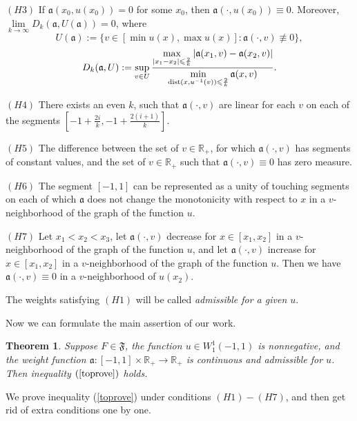 \documentclass[12pt]{article}
\newcommand{\Real}{\mathbb R}
\newcommand{\abs}[1]{\left\vert#1\right\vert}
\renewcommand{\le}{\leqslant}
\newtheorem{thm}{Theorem}
\newcommand{\W}{W_1^1}
\newcommand{\dist}{\mathop{\rm dist}\nolimits}
\begin{document}
\bigskip
\noindent
$(H3)$ If $\mathfrak a(x_0, u(x_0)) = 0$ for some $x_0$, then $\mathfrak a(\cdot, u(x_0)) \equiv 0$.
Moreover, $\lim\limits_{k \to \infty} D_k(\mathfrak a, U(\mathfrak a)) = 0$, where
$$U(\mathfrak a) := \{ v \in [\min u(x), \max u(x)]: \mathfrak a(\cdot, v) \not \equiv 0 \},$$
\begin{equation}
\label{bigD}
D_k(\mathfrak a, U): = \sup \limits_{v \in U}
\frac{\max \limits_{\abs{x_1 - x_2} \le \frac{2}{k}} \abs{\mathfrak a(x_1, v) - \mathfrak a(x_2, v)}}
{\min \limits_{\dist (x, u^{-1} (v)) \le \frac{2}{k}} \mathfrak a(x, v)}.
\end{equation}

\bigskip
\noindent
$(H4)$ There exists an even $k$, such that $\mathfrak a(\cdot, v)$ are linear for each $v$ on each of the segments
$[-1 + \frac{2i}{k}, -1 + \frac{2(i + 1)}{k}]$.

\bigskip
\noindent
$(H5)$ The difference between the
set of $v \in \Real_+$, for which $\mathfrak a(\cdot, v)$ has segments of constant values,
and the set of $v \in \Real_+$ such that $\mathfrak a(\cdot, v) \equiv 0$
has zero measure.

\bigskip
\noindent
$(H6)$ The segment $[-1, 1]$ can be represented as a unity of touching segments
on each of which $\mathfrak a$ does not change the monotonicity with respect to $x$ in a $v$-neighborhood of the graph of the function $u$.

\bigskip
\noindent
$(H7)$ Let $x_1 < x_2 < x_3$,
let $\mathfrak a(\cdot, v)$ decrease for $x \in [x_1, x_2]$ in a $v$-neighborhood of the graph of the function $u$,
and let $\mathfrak a(\cdot, v)$ increase for $x \in [x_1, x_2]$ in a $v$-neighborhood of the graph of the function $u$.
Then we have $\mathfrak a(\cdot, v) \equiv 0$ in a $v$-neighborhood of $u(x_2)$.

\bigskip

The weights satisfying $(H1)$ will be called {\it admissible for a given $u$}.

\medskip

Now we can formulate the main assertion of our work.
\begin{thm}
\label{mainThm}
Suppose $F \in \mathfrak{F}$, the function $u \in \W(-1, 1)$ is nonnegative,
and the weight function $\mathfrak a: [-1, 1] \times \Real_+ \to \Real_+$ is continuous
and admissible for $u$.
Then inequality $(\ref{toprove})$ holds.
\end{thm}

We prove inequality (\ref{toprove}) under conditions $(H1)-(H7)$,
and then get rid of extra conditions one by one.
\end{document}
